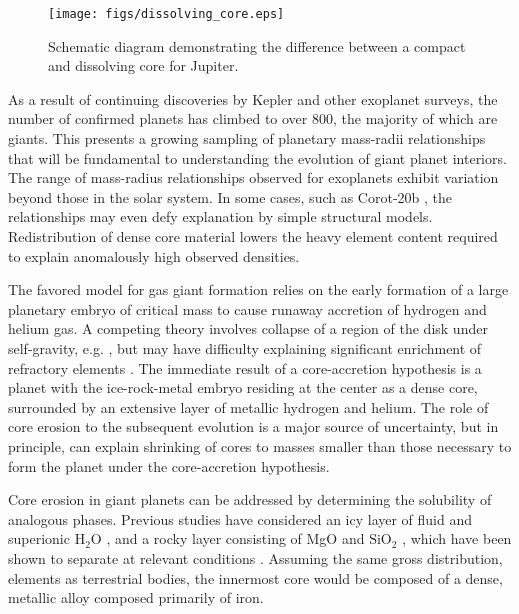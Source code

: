  \begin{figure}[!h] %
   \centering
   \texttt{[image: figs/dissolving\_core.eps]} 
   \caption{Schematic diagram demonstrating the difference between a compact and dissolving core for Jupiter.\label{fig:dissolve_core}}
\end{figure}



As a result of continuing discoveries by Kepler \citep{Borucki2010} and other exoplanet surveys, the
number of confirmed planets has climbed to over 800, the majority of which are
giants. This presents a growing sampling of planetary
mass-radii relationships that will be fundamental to understanding the evolution of
giant planet interiors. The range of mass-radius relationships observed for
exoplanets exhibit variation beyond those in the solar system. In some cases,
such as Corot-20b \citep{deleuil2011}, the relationships may even defy explanation by
simple structural models. Redistribution of dense core material lowers the
heavy element content required to explain anomalously high observed densities.

The favored model for gas giant formation
\citep{Mizuno1978,Bodenheimer1986,Pollack1996} relies on the early
formation of a large planetary embryo of critical mass to cause runaway
accretion of hydrogen and helium gas. A competing theory involves collapse of
a region of the disk under self-gravity, e.g. \citep{Boss1997}, but may
have difficulty explaining significant enrichment of refractory elements \citep{Hubbard2002,Guillot2005}.
The immediate result of a core-accretion hypothesis is a planet with the
ice-rock-metal embryo residing at the center as a dense core, surrounded by an
extensive layer of metallic hydrogen and helium. The role of core erosion to
the subsequent evolution is a major source of uncertainty, but in principle, can explain shrinking of
cores to masses smaller than those necessary to form the planet under the
core-accretion hypothesis.

Core erosion in giant planets can be addressed by determining the solubility 
of analogous phases. Previous studies have considered an icy
layer of fluid and superionic $\mathrm{H}_2\mathrm{O}$
\citep{Wilson2012a,Wilson2013}, and a rocky layer consisting of
MgO \citep{wilson12b} and $\mathrm{SiO}_2$ \citep{Gonzalez2013}, which have been
shown to separate at relevant conditions \citep{umemoto2006}. Assuming the
same gross distribution, elements as terrestrial bodies, the innermost core
would be composed of a dense, metallic alloy composed primarily of iron.

